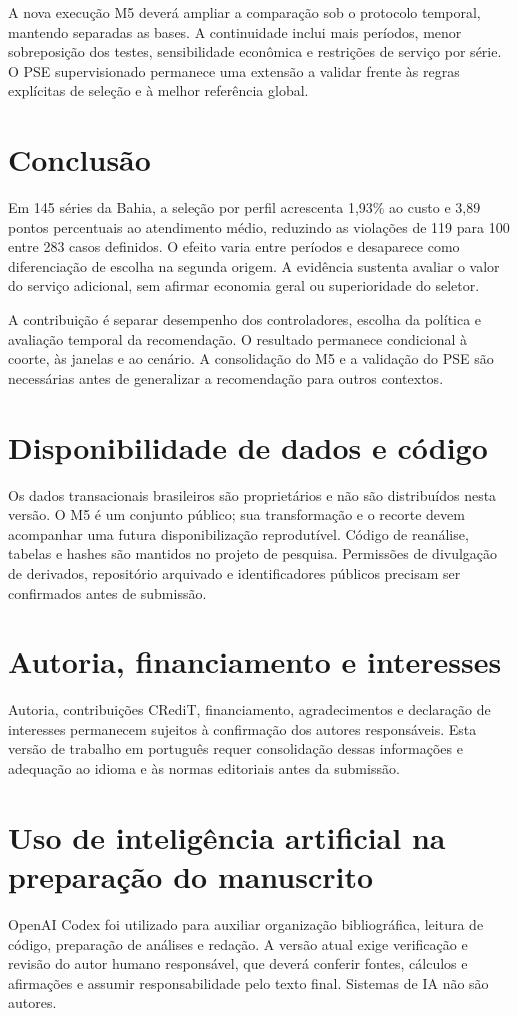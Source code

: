 \documentclass[preprint,12pt]{elsarticle}
\begin{document}
A nova execução M5 deverá ampliar a comparação sob o protocolo temporal, mantendo separadas as bases. A continuidade inclui mais períodos, menor sobreposição dos testes, sensibilidade econômica e restrições de serviço por série. O PSE supervisionado permanece uma extensão a validar frente às regras explícitas de seleção e à melhor referência global.

\section{Conclusão}
Em 145 séries da Bahia, a seleção por perfil acrescenta 1,93\% ao custo e 3,89 pontos percentuais ao atendimento médio, reduzindo as violações de 119 para 100 entre 283 casos definidos. O efeito varia entre períodos e desaparece como diferenciação de escolha na segunda origem. A evidência sustenta avaliar o valor do serviço adicional, sem afirmar economia geral ou superioridade do seletor.

A contribuição é separar desempenho dos controladores, escolha da política e avaliação temporal da recomendação. O resultado permanece condicional à coorte, às janelas e ao cenário. A consolidação do M5 e a validação do PSE são necessárias antes de generalizar a recomendação para outros contextos.

\section*{Disponibilidade de dados e código}
Os dados transacionais brasileiros são proprietários e não são distribuídos nesta versão. O M5 é um conjunto público; sua transformação e o recorte devem acompanhar uma futura disponibilização reprodutível. Código de reanálise, tabelas e hashes são mantidos no projeto de pesquisa. Permissões de divulgação de derivados, repositório arquivado e identificadores públicos precisam ser confirmados antes de submissão.
\section*{Autoria, financiamento e interesses}
Autoria, contribuições CRediT, financiamento, agradecimentos e declaração de interesses permanecem sujeitos à confirmação dos autores responsáveis. Esta versão de trabalho em português requer consolidação dessas informações e adequação ao idioma e às normas editoriais antes da submissão.
\section*{Uso de inteligência artificial na preparação do manuscrito}
OpenAI Codex foi utilizado para auxiliar organização bibliográfica, leitura de código, preparação de análises e redação. A versão atual exige verificação e revisão do autor humano responsável, que deverá conferir fontes, cálculos e afirmações e assumir responsabilidade pelo texto final. Sistemas de IA não são autores.

\appendix



\end{document}
